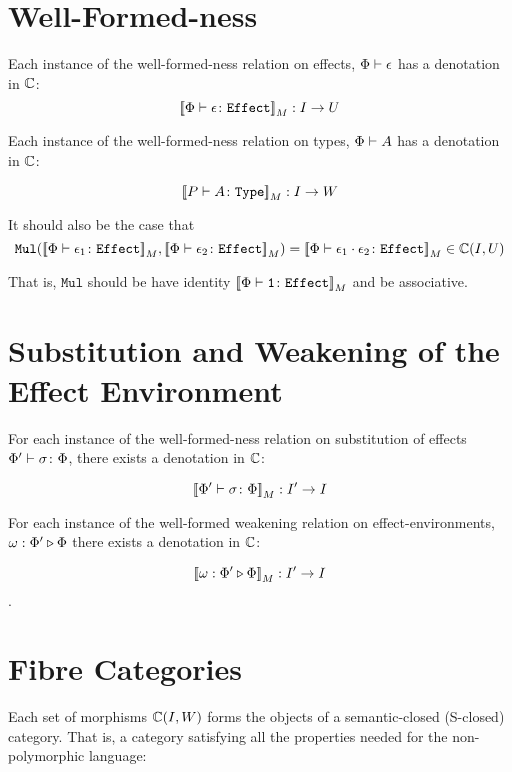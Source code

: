 \documentclass{report}
\newcommand\type[0]{\texttt{Type}}
\newcommand\effect[0]{\texttt{Effect}}
\newcommand\ciw[0]{\C(I, W)}
\newcommand\ciu[0]{\C(I, U)}
\newcommand\Mul[0]{\texttt{Mul}}
\begin{document}
\section{Well-Formed-ness}

Each instance of the well-formed-ness relation on effects, $\Phi\vdash \epsilon$ has a denotation in $\mathbb{C}$: \begin{equation}
    \deno{\typerelation{\P}{\e}{\effect}}: I \rightarrow U
\end{equation}


Each instance of the well-formed-ness relation on types, $\Phi\vdash A$ has a denotation in $\mathbb{C}$:

\begin{equation}
    \deno{\typerelation{P}{A}{\type}}: I \rightarrow W
\end{equation}

It should also be the case that \begin{equation}
    \Mul(\deno{\typerelation{\P}{\e_1}{\effect}}, \deno{\typerelation{\P}{\e_2}{\effect}}) = \deno{\typerelation{\P}{\e_1\dot\e_2}{\effect}} \in \ciu
\end{equation}

That is, $\Mul$ should be have identity $\deno{\typerelation{\P}{\1}{\effect}}$ and be associative.
\section{Substitution and Weakening of the Effect Environment}

For each instance of the well-formed-ness relation on substitution of effects $\Phi' \vdash \sigma \colon \Phi$, there exists a denotation in $\mathbb{C}$:

\begin{equation}
    {\bf [\![}\Phi' \vdash \sigma \colon \Phi{\bf ]\!]}_M: I'\rightarrow I
\end{equation}

For each instance of the well-formed weakening relation on effect-environments, $\omega : \Phi' \triangleright \Phi$
 there exists a denotation in $\mathbb{C}$:

 \begin{equation}
     {\bf [\![}\omega : \Phi' \triangleright \Phi{\bf ]\!]}_M: I'\rightarrow I
 \end{equation}.

\section{Fibre Categories}
Each set of morphisms $\ciw$ forms the objects of a semantic-closed (S-closed) category. That is, a category satisfying all the properties needed for the non-polymorphic language:
\end{document}
